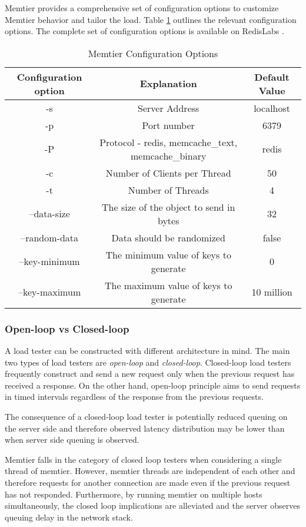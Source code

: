 Memtier provides a comprehensive set of configuration options to customize Memtier behavior and tailor the load. Table \ref{tab:memtier_config} outlines the relevant configuration options. The complete set of configuration options is available on RedisLabs \cite{MemtierConfiguration}.

\begin{table}[h!]
\centering
\begin{tabular}{| c c c |}
 \hline
 Configuration option & Explanation & Default Value\\ [0.5ex]
 \hline\hline

 -s & Server Address & localhost \\
 -p & Port number & 6379 \\
 -P & Protocol - redis, memcache\_text, memcache\_binary & redis \\
 -c & Number of Clients per Thread & 50 \\
 -t & Number of Threads & 4 \\
 --data-size & The size of the object to send in bytes & 32 \\
 --random-data & Data should be randomized & false \\
 --key-minimum & The minimum value of keys to generate & 0 \\
 --key-maximum & The maximum value of keys to generate & 10 million \\

 \hline

\end{tabular}
\caption{Memtier Configuration Options}
\label{tab:memtier_config}
\end{table}


\subsubsection{Open-loop vs Closed-loop}
A load tester can be constructed with different architecture in mind. The main two types of load testers are \textit{open-loop} and \textit{closed-loop}. Closed-loop load testers frequently construct and send a new request only when the previous request has received a response. On the other hand, open-loop principle aims to send requests in timed intervals regardless of the response from the previous requests.

The consequence of a closed-loop load tester is potentially reduced queuing on the server side and therefore observed latency distribution may be lower than when server side queuing is observed.

Memtier falls in the category of closed loop testers when considering a single thread of memtier. However, memtier threads are independent of each other and therefore requests for another connection are made even if the previous request has not responded. Furthermore, by running memtier on multiple hosts simultaneously, the closed loop implications are alleviated and the server observes queuing delay in the network stack.
